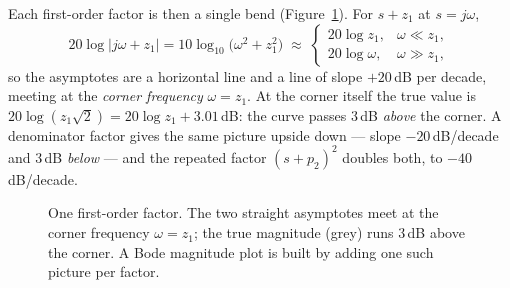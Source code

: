 \documentclass[11pt]{article}
\begin{document}
Each first-order factor is then a single bend (Figure~\ref{fig:bode}). For
$s+z_1$ at $s=j\omega$,
\[
   20\log|j\omega+z_1| = 10\log_{10}\bigl(\omega^{2}+z_1^{2}\bigr)
   \;\approx\;
   \begin{cases}
      20\log z_1, & \omega \ll z_1,\\[2pt]
      20\log \omega, & \omega \gg z_1,
   \end{cases}
\]
so the asymptotes are a horizontal line and a line of slope $+20$\,dB per decade,
meeting at the \emph{corner frequency} $\omega=z_1$. At the corner itself the true
value is $20\log(z_1\sqrt2) = 20\log z_1 + 3.01$\,dB: the curve passes $3$\,dB
\emph{above} the corner. A denominator factor gives the same picture upside down
--- slope $-20$\,dB/decade and $3$\,dB \emph{below} --- and the repeated factor
$(s+p_2)^{2}$ doubles both, to $-40$\,dB/decade.

\begin{figure}[htb]
\centering
{}
\caption{One first-order factor. The two straight asymptotes meet at the corner
frequency $\omega=z_1$; the true magnitude (grey) runs $3$\,dB above the corner.
A Bode magnitude plot is built by adding one such picture per factor.}
\label{fig:bode}
\end{figure}
\end{document}
